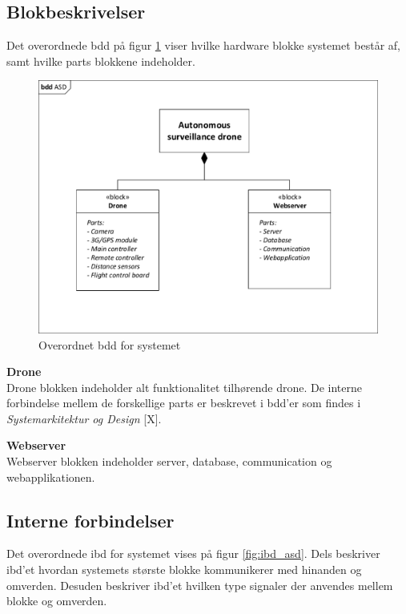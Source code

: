 \newpage
 
\subsection{Blokbeskrivelser}
Det overordnede bdd på figur \ref{fig:bdd_asd} viser hvilke hardware blokke systemet består af, samt hvilke parts blokkene indeholder.

\begin{figure}[H]
	\centering
	\includegraphics[width=1.0\textwidth]{Billeder/Projektbeskrivelse/bdd_overordnet.pdf}
	\caption{Overordnet bdd for systemet}
	\label{fig:bdd_asd}
\end{figure}

\textbf{Drone} \\
Drone blokken indeholder alt funktionalitet tilhørende drone. De interne forbindelse mellem de forskellige parts er beskrevet i bdd'er som findes i \textit{Systemarkitektur og Design} [X].

\textbf{Webserver} \\
Webserver blokken indeholder server, database, communication og webapplikationen.

\newpage

\subsection{Interne forbindelser}
\vspace{-0.3cm}	
Det overordnede ibd for systemet vises på figur \ref{fig:ibd_asd}. Dels beskriver ibd'et hvordan  systemets største blokke kommunikerer med hinanden og omverden. Desuden beskriver ibd'et hvilken type signaler der anvendes mellem blokke og omverden. 

